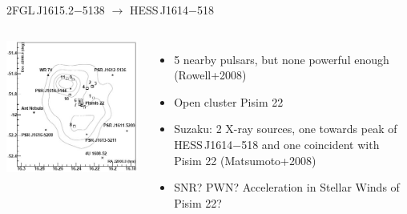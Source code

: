 \documentclass[12pt]{beamer}
\begin{document}
\begin{frame}{2FGL\,J1615.2$-$5138 $\rightarrow$ HESS\,J1614$-$518}

  \begin{columns}
    \includegraphics[scale=0.3]{plots/Som_9_08_p1.jpg}
    \begin{itemize}
      \item 5 nearby pulsars, but none powerful enough (Rowell+2008)
      \item Open cluster Pisim 22 
      \item Suzaku: 2 X-ray sources, one towards peak 
        of HESS\,J1614$-$518 and one coincident with Pisim 22
        (Matsumoto+2008)
      \item SNR? PWN? Acceleration in Stellar Winds of Pisim 22?
    \end{itemize}
  \end{columns}
\end{frame}
\end{document}

